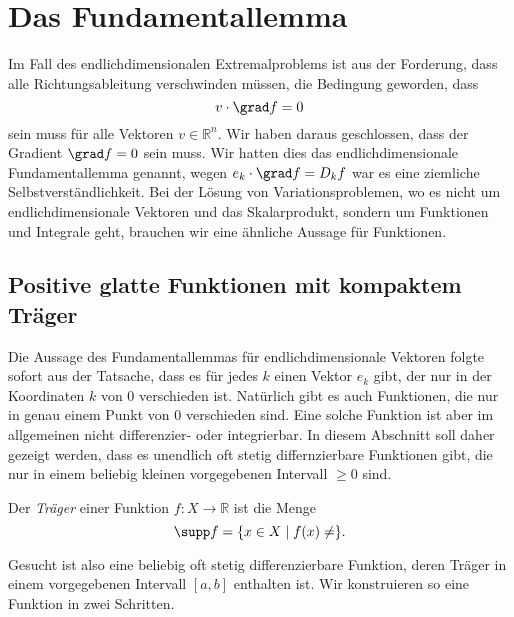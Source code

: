 %
%
%
\section{Das Fundamentallemma
\label{buch:variation:section:fundamentallemma}}
Im Fall des endlichdimensionalen Extremalproblems ist aus der
Forderung, dass alle Richtungsableitung verschwinden müssen, 
die Bedingung geworden, dass
\[
v\cdot\grad f = 0
\]
sein muss für alle Vektoren $v\in\mathbb{R}^n$.
Wir haben daraus geschlossen, dass der Gradient $\grad f=0$
sein muss.
Wir hatten dies das endlichdimensionale Fundamentallemma genannt,
wegen $e_k\cdot \grad f = D_kf$ war es eine ziemliche Selbstverständlichkeit.
Bei der Lösung von Variationsproblemen, wo es nicht um endlichdimensionale
Vektoren und das Skalarprodukt, sondern um Funktionen und Integrale
geht, brauchen wir eine ähnliche Aussage für Funktionen.

%
%
\subsection{Positive glatte Funktionen mit kompaktem Träger
\label{buch:variation:fundamentallemma:subsection:positiv}}
Die Aussage des Fundamentallemmas für endlichdimensionale Vektoren 
folgte sofort aus der Tatsache, dass es für jedes $k$ einen Vektor
$e_k$ gibt, der nur in der Koordinaten $k$ von $0$ verschieden ist.
Natürlich gibt es auch Funktionen, die nur in genau einem Punkt
von $0$ verschieden sind.
Eine solche Funktion ist aber im allgemeinen nicht differenzier-
oder integrierbar.
In diesem Abschnitt soll daher gezeigt werden, dass es unendlich
oft stetig differnzierbare Funktionen gibt, die nur in einem beliebig
kleinen vorgegebenen Intervall $\ge 0$ sind.

\begin{definition}[Träger]
\label{buch:variation:def:traeger}
Der {\em Träger} einer Funktion $f\colon X\to\mathbb{R}$ ist die Menge
%
\[
\supp f = \{ x\in X\mid f(x)\ne \}.
\]
%
\end{definition}

Gesucht ist also eine beliebig oft stetig differenzierbare Funktion,
deren Träger in einem vorgegebenen Intervall $[a,b]$ enthalten ist.
Wir konstruieren so eine Funktion in zwei Schritten.



